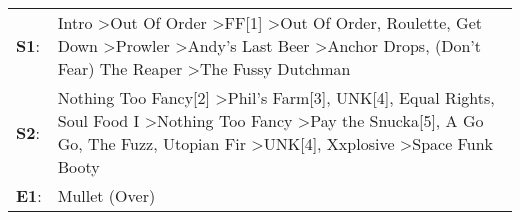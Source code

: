 \begin{supertabular}{p{0.03\textwidth}p{0.92\textwidth}}
 \textbf{S1}:  &                                                                Intro\textsuperscript{} \textgreater \enspace Out Of Order\textsuperscript{} \textgreater \enspace FF[1]\textsuperscript{} \textgreater \enspace Out Of Order\textsuperscript{}, \enspace Roulette\textsuperscript{}, \enspace Get Down\textsuperscript{} \textgreater \enspace Prowler\textsuperscript{} \textgreater \enspace Andy's Last Beer\textsuperscript{} \textgreater \enspace Anchor Drops\textsuperscript{}, \enspace (Don't Fear) The Reaper\textsuperscript{} \textgreater \enspace The Fussy Dutchman\textsuperscript{}  \enspace  \\
 \textbf{S2}:  &  Nothing Too Fancy[2]\textsuperscript{} \textgreater \enspace Phil's Farm[3]\textsuperscript{}, \enspace UNK[4]\textsuperscript{}, \enspace Equal Rights\textsuperscript{}, \enspace Soul Food I\textsuperscript{} \textgreater \enspace Nothing Too Fancy\textsuperscript{} \textgreater \enspace Pay the Snucka[5]\textsuperscript{}, \enspace A Go Go\textsuperscript{}, \enspace The Fuzz\textsuperscript{}, \enspace Utopian Fir\textsuperscript{} \textgreater \enspace UNK[4]\textsuperscript{}, \enspace Xxplosive\textsuperscript{} \textgreater \enspace Space Funk Booty\textsuperscript{}  \enspace  \\
 \textbf{E1}:  &                                                                                                                                                                                                                                                                                                                                                                                                                                                                                                                                                                       Mullet (Over)\textsuperscript{}  \enspace  \\
\end{supertabular}
